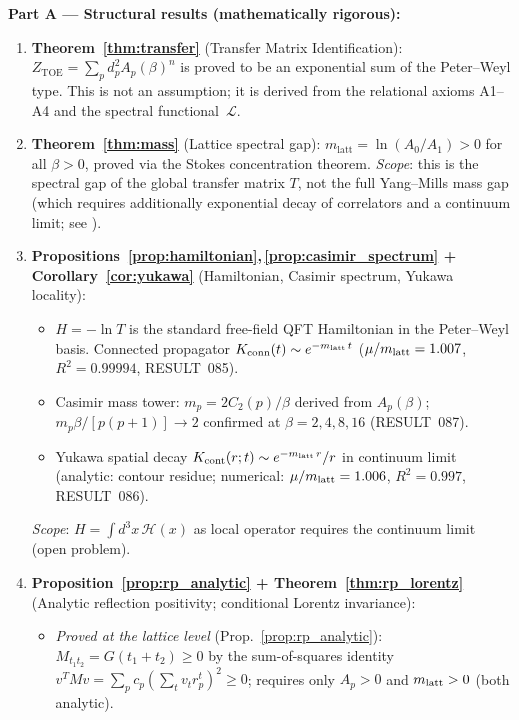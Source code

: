 \documentclass[12pt]{article}
\theoremstyle{definition}
\theoremstyle{remark}
\newcommand{\TOE}{\mathrm{TOE}}
\begin{document}
\medskip
\noindent
\textbf{Part A — Structural results (mathematically rigorous):}
\begin{enumerate}
\item \textbf{Theorem~\ref{thm:transfer}} (Transfer Matrix Identification):
  $Z_\TOE = \sum_p d_p^2 A_p(\beta)^n$ is proved to be an exponential sum
  of the Peter--Weyl type.  This is not an assumption; it is derived from
  the relational axioms A1--A4 and the spectral functional~$\mathcal{L}$.
\item \textbf{Theorem~\ref{thm:mass}} (Lattice spectral gap):
  $m_{\mathrm{latt}} = \ln(A_0/A_1) > 0$ for all $\beta > 0$, proved via
  the Stokes concentration theorem.
  \emph{Scope}: this is the spectral gap of the global transfer matrix $T$,
  not the full Yang--Mills mass gap (which requires additionally exponential
  decay of correlators and a continuum limit; see \cite{OlbrykMassGap2026}).
\item \textbf{Propositions~\ref{prop:hamiltonian},\,\ref{prop:casimir_spectrum}
  + Corollary~\ref{cor:yukawa}} (Hamiltonian, Casimir spectrum, Yukawa locality):
  \begin{itemize}
  \item $H = -\ln T$ is the standard free-field QFT Hamiltonian in the Peter--Weyl basis.
        Connected propagator $K_{\rm conn}(t) \sim e^{-m_{\rm latt}\,t}$
        ($\mu/m_{\rm latt} = 1.007$, $R^2 = 0.99994$, RESULT~085).
  \item Casimir mass tower: $m_p = 2C_2(p)/\beta$ derived from $A_p(\beta)$;
        $m_p\beta/[p(p+1)] \to 2$ confirmed at $\beta = 2, 4, 8, 16$ (RESULT~087).
  \item Yukawa spatial decay $K_{\rm cont}(r;t) \sim e^{-m_{\rm latt}\,r}/r$
        in continuum limit (analytic: contour residue; numerical: $\mu/m_{\rm latt}=1.006$,
        $R^2=0.997$, RESULT~086).
  \end{itemize}
  \emph{Scope}: $H = \int\! d^3x\,\mathcal{H}(x)$ as local operator requires the
  continuum limit (open problem).
\item \textbf{Proposition~\ref{prop:rp_analytic} + Theorem~\ref{thm:rp_lorentz}}
  (Analytic reflection positivity; conditional Lorentz invariance):
  \begin{itemize}
  \item \emph{Proved at the lattice level} (Prop.~\ref{prop:rp_analytic}):
    $M_{t_1 t_2} = G(t_1+t_2) \geq 0$ by the sum-of-squares identity
    $v^T M v = \sum_p c_p(\sum_t v_t r_p^t)^2 \geq 0$;
    requires only $A_p > 0$ and $m_{\rm latt} > 0$ (both analytic).

\end{itemize}
\end{enumerate}
\end{document}
